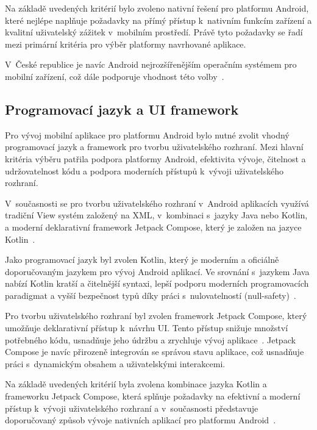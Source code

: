 Na základě uvedených kritérií bylo zvoleno nativní řešení pro platformu Android, které nejlépe naplňuje požadavky na přímý přístup k~nativním funkcím zařízení a kvalitní uživatelský zážitek v~mobilním prostředí.
Právě tyto požadavky se řadí mezi primární kritéria pro výběr platformy navrhované aplikace.

V~České republice je navíc Android nejrozšířenějším operačním systémem pro mobilní zařízení, což dále podporuje vhodnost této volby~\parencite{android_market_share_cz}.

\subsection{Programovací jazyk a UI framework}

Pro vývoj mobilní aplikace pro platformu Android bylo nutné zvolit vhodný programovací jazyk a framework pro tvorbu uživatelského rozhraní.
Mezi hlavní kritéria výběru patřila podpora platformy Android, efektivita vývoje, čitelnost a udržovatelnost kódu a podpora moderních přístupů k~vývoji uživatelského rozhraní.

V~současnosti se pro tvorbu uživatelského rozhraní v~Android aplikacích využívá tradiční View systém založený na XML, v~kombinaci s~jazyky Java nebo Kotlin, a moderní deklarativní framework Jetpack Compose, který je založen na jazyce Kotlin~\parencite{android_recommended_architecture}.

Jako programovací jazyk byl zvolen Kotlin, který je moderním a oficiálně doporučovaným jazykem pro vývoj Android aplikací.
Ve srovnání s~jazykem Java nabízí Kotlin kratší a čitelnější syntaxi, lepší podporu moderních programovacích paradigmat a vyšší bezpečnost typů díky práci s~nulovatelností (null-safety)~\parencite{kotlin_vs_java_android}.

Pro tvorbu uživatelského rozhraní byl zvolen framework Jetpack Compose, který umožňuje deklarativní přístup k~návrhu UI\@.
Tento přístup snižuje množství potřebného kódu, usnadňuje jeho údržbu a zrychluje vývoj aplikace~\parencite{android_recommended_architecture}.
Jetpack Compose je navíc přirozeně integrován se správou stavu aplikace, což usnadňuje práci s~dynamickým obsahem a uživatelskými interakcemi.

Na základě uvedených kritérií byla zvolena kombinace jazyka Kotlin a frameworku Jetpack Compose, která splňuje požadavky na efektivní a moderní přístup k~vývoji uživatelského rozhraní a v~současnosti představuje doporučovaný způsob vývoje nativních aplikací pro platformu Android~\parencite{compose_recommended}.


